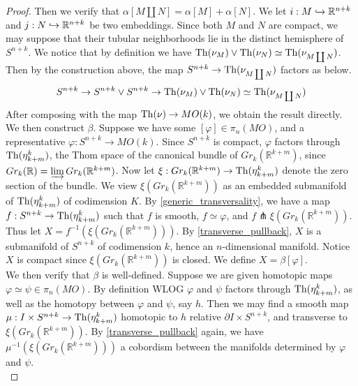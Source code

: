 \begin{proof}
		Then we verify that $\alpha[M\coprod N]=\alpha[M]+\alpha[N]$. We let $i:M\hookrightarrow\mathbb{R}^{n+k}$ and $j:N\hookrightarrow\mathbb{R}^{n+k}$ be two embeddings. Since both $M$ and $N$ are compact, we may suppose that their tubular neighborhoods lie in the distinct hemisphere of $S^{n+k}$. We notice that by definition we have $\operatorname{\mathrm{Th}}(\nu_M)\vee\operatorname{\mathrm{Th}}(\nu_N)\simeq\operatorname{\mathrm{Th}}(\nu_{M\coprod N})$. Then by the construction above, the map $S^{n+k}\to\operatorname{\mathrm{Th}}(\nu_{M\coprod N})$ factors as below. 
		\[ S^{n+k}\to S^{n+k}\vee S^{n+k}\to\operatorname{\mathrm{Th}}(\nu_M)\vee\operatorname{\mathrm{Th}}(\nu_N)\simeq\operatorname{\mathrm{Th}}(\nu_{M\coprod N}) \]
		After composing with the map $\operatorname{\mathrm{Th}}(\nu)\to MO(k)$, we obtain the result directly. \\
		We then construct $\beta$. Suppose we have some $[\varphi]\in\pi_n(MO)$, and a representative $\varphi:S^{n+k}\to MO(k)$. Since $S^{n+k}$ is compact, $\varphi$ factors through $\operatorname{\mathrm{Th}}(\eta^k_{k+m})$, the Thom space of the canonical bundle of $Gr_k(\mathbb{R}^{k+m})$, since $Gr_k(\mathbb{R})=\varinjlim Gr_k(\mathbb{R}^{k+m})$. Now let $\xi:Gr_k(\mathbb{R}^{k+m})\to\operatorname{\mathrm{Th}}(\eta^k_{k+m})$ denote the zero section of the bundle. We view $\xi(Gr_k(\mathbb{R}^{k+m}))$ as an embedded submanifold of $\operatorname{\mathrm{Th}}(\eta^k_{k+m})$ of codimension $K$. By \cref{generic_transversality}, we have a map $f:S^{n+k}\to\operatorname{\mathrm{Th}}(\eta^k_{k+m})$ such that $f$ is smooth, $f\simeq\varphi$, and $f\pitchfork\xi(Gr_k(\mathbb{R}^{k+m}))$. Thus let $X=f^{-1}(\xi(Gr_k(\mathbb{R}^{k+m})))$. By \cref{transverse_pullback}, $X$ is a submanifold of $S^{n+k}$ of codimension $k$, hence an $n$-dimensional manifold. Notice $X$ is compact since $\xi(Gr_k(\mathbb{R}^{k+m}))$ is closed. We define $X=\beta[\varphi]$. \\
		We then verify that $\beta$ is well-defined. Suppose we are given homotopic maps $\varphi\simeq\psi\in\pi_n(MO)$. By definition WLOG $\varphi$ and $\psi$ factors through $\operatorname{\mathrm{Th}}(\eta^k_{k+m})$, as well as the homotopy between $\varphi$ and $\psi$, say $h$. Then we may find a smooth map $\mu:I\times S^{n+k}\to\operatorname{\mathrm{Th}}(\eta^k_{k+m})$ homotopic to $h$ relative $\partial I\times S^{n+k}$, and transverse to $\xi(Gr_k(\mathbb{R}^{k+m}))$. By \cref{transverse_pullback} again, we have $\mu^{-1}(\xi(Gr_k(\mathbb{R}^{k+m})))$ a cobordism between the manifolds determined by $\varphi$ and $\psi$. \\

\end{proof}
